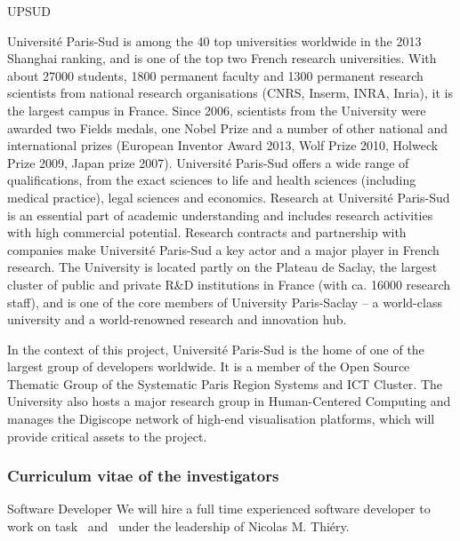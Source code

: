 \begin{sitedescription}{UPSUD} \label{desc:ParisSud}

Université Paris-Sud is among the 40 top universities worldwide in the
2013 Shanghai ranking, and is one of the top two French research
universities. With about 27000 students, 1800 permanent faculty
and 1300 permanent research scientists from national research
organisations (CNRS, Inserm, INRA, Inria), it is the largest campus in
France. Since 2006, scientists from the University were awarded two
Fields medals, one Nobel Prize and a number of other national and international prizes
(European Inventor Award 2013, Wolf Prize 2010, Holweck Prize 2009,
Japan prize 2007).  Université Paris-Sud offers a
wide range of qualifications, from the exact sciences to life and health
sciences (including medical practice), legal sciences and economics. 
Research at Université Paris-Sud is an essential part of academic understanding 
and includes research activities with high commercial potential. 
Research contracts and partnership with companies make
Université Paris-Sud a key actor and a major player in French
research.  The University is located partly on the Plateau de Saclay,
the largest cluster of public and private R\&D institutions in France
(with ca. 16000 research staff), and is one of the core members of 
University Paris-Saclay – a world-class university and a
world-renowned research and innovation hub.

In the context of this project, Université Paris-Sud is the
home of one of the largest group of \Sage developers worldwide.
It is a member of the Open Source Thematic Group of the Systematic
Paris Region Systems and ICT Cluster. 
The University also hosts a major research group in Human-Centered Computing
and manages the Digiscope network of high-end visualisation platforms,
which will provide critical assets to the project.

\subsubsection*{Curriculum vitae of the investigators}





\begin{participant}[type=res,PM=21]{Software Developer}
  We will hire a full time experienced software developer to work on
  task~ and~ %
  under the leadership of Nicolas M. Thiéry.


\end{participant}
\end{sitedescription}
